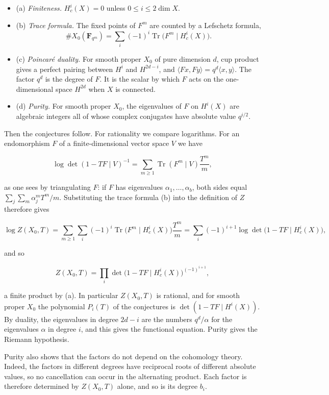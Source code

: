 \documentclass[11pt]{article}
\begin{document}
\begin{itemize}
\item (a) \emph{Finiteness.} \(H^i_c(X)=0\) unless \(0\le i\le 2\dim X\).
\item (b) \emph{Trace formula.} The fixed points of \(F^m\) are counted by a Lefschetz formula, \[
  \#X_0(\mathbf F_{q^m})=\sum_i(-1)^i\operatorname{Tr}\bigl(F^m\mid H^i_c(X)\bigr).
  \]
\item (c) \emph{Poincaré duality.} For smooth proper \(X_0\) of pure dimension \(d\), cup product gives a perfect pairing between \(H^i\) and \(H^{2d-i}\), and \(\langle Fx,Fy\rangle=q^d\langle x,y\rangle\). The factor \(q^d\) is the degree of \(F\). It is the scalar by which \(F\) acts on the one-dimensional space \(H^{2d}\) when \(X\) is connected.
\item (d) \emph{Purity.} For smooth proper \(X_0\), the eigenvalues of \(F\) on \(H^i(X)\) are algebraic integers all of whose complex conjugates have absolute value \(q^{i/2}\).
\end{itemize}

Then the conjectures follow. For rationality we compare logarithms. For an endomorphism \(F\) of a finite-dimensional vector space \(V\) we have

\[
\log\det(1-TF\mid V)^{-1}=\sum_{m\ge1}\operatorname{Tr}(F^m\mid V)\frac{T^m}{m},
\]

as one sees by triangulating \(F\): if \(F\) has eigenvalues \(\alpha_1,\dots,\alpha_b\), both sides equal \(\sum_j\sum_m\alpha_j^mT^m/m\). Substituting the trace formula (b) into the definition of \(Z\) therefore gives

\[
\log Z(X_0,T)=\sum_{m\ge1}\sum_i(-1)^i\operatorname{Tr}\bigl(F^m\mid H^i_c(X)\bigr)\frac{T^m}{m}
=\sum_i(-1)^{i+1}\log\det\bigl(1-TF\mid H^i_c(X)\bigr),
\]

and so

\[
Z(X_0,T)=\prod_i\det\bigl(1-TF\mid H^i_c(X)\bigr)^{(-1)^{i+1}},
\]

a finite product by (a). In particular \(Z(X_0,T)\) is rational, and for smooth proper \(X_0\) the polynomial \(P_i(T)\) of the conjectures is \(\det(1-TF\mid H^i(X))\). By duality, the eigenvalues in degree \(2d-i\) are the numbers \(q^d/\alpha\) for the eigenvalues \(\alpha\) in degree \(i\), and this gives the functional equation. Purity gives the Riemann hypothesis.

Purity also shows that the factors do not depend on the cohomology theory. Indeed, the factors in different degrees have reciprocal roots of different absolute values, so no cancellation can occur in the alternating product. Each factor is therefore determined by \(Z(X_0,T)\) alone, and so is its degree \(b_i\).
\end{document}
